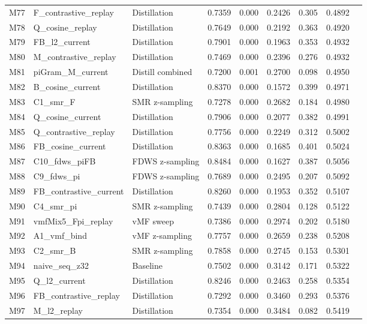 \documentclass[11pt,a4paper]{article}
\begin{document}
\begin{small}
\begin{longtable}{llp{3cm}rrrrrr}
    M77 & F\_contrastive\_replay & Distillation & 0.7359 & 0.000 & 0.2426 & 0.305 & 0.4892 \\
    M78 & Q\_cosine\_replay & Distillation & 0.7649 & 0.000 & 0.2192 & 0.363 & 0.4920 \\
    M79 & FB\_l2\_current & Distillation & 0.7901 & 0.000 & 0.1963 & 0.353 & 0.4932 \\
    M80 & M\_contrastive\_replay & Distillation & 0.7469 & 0.000 & 0.2396 & 0.276 & 0.4932 \\
    M81 & piGram\_M\_current & Distill combined & 0.7200 & 0.001 & 0.2700 & 0.098 & 0.4950 \\
    M82 & B\_cosine\_current & Distillation & 0.8370 & 0.000 & 0.1572 & 0.399 & 0.4971 \\
    M83 & C1\_smr\_F & SMR z-sampling & 0.7278 & 0.000 & 0.2682 & 0.184 & 0.4980 \\
    M84 & Q\_cosine\_current & Distillation & 0.7906 & 0.000 & 0.2077 & 0.382 & 0.4991 \\
    M85 & Q\_contrastive\_replay & Distillation & 0.7756 & 0.000 & 0.2249 & 0.312 & 0.5002 \\
    M86 & FB\_cosine\_current & Distillation & 0.8363 & 0.000 & 0.1685 & 0.401 & 0.5024 \\
    M87 & C10\_fdws\_piFB & FDWS z-sampling & 0.8484 & 0.000 & 0.1627 & 0.387 & 0.5056 \\
    M88 & C9\_fdws\_pi & FDWS z-sampling & 0.7689 & 0.000 & 0.2495 & 0.207 & 0.5092 \\
    M89 & FB\_contrastive\_current & Distillation & 0.8260 & 0.000 & 0.1953 & 0.352 & 0.5107 \\
    M90 & C4\_smr\_pi & SMR z-sampling & 0.7439 & 0.000 & 0.2804 & 0.128 & 0.5122 \\
    M91 & vmfMix5\_Fpi\_replay & vMF sweep & 0.7386 & 0.000 & 0.2974 & 0.202 & 0.5180 \\
    M92 & A1\_vmf\_bind & vMF z-sampling & 0.7757 & 0.000 & 0.2659 & 0.238 & 0.5208 \\
    M93 & C2\_smr\_B & SMR z-sampling & 0.7858 & 0.000 & 0.2745 & 0.153 & 0.5301 \\
    M94 & naive\_seq\_z32 & Baseline & 0.7502 & 0.000 & 0.3142 & 0.171 & 0.5322 \\
    M95 & Q\_l2\_current & Distillation & 0.8246 & 0.000 & 0.2463 & 0.258 & 0.5354 \\
    M96 & FB\_contrastive\_replay & Distillation & 0.7292 & 0.000 & 0.3460 & 0.293 & 0.5376 \\
    M97 & M\_l2\_replay & Distillation & 0.7354 & 0.000 & 0.3484 & 0.082 & 0.5419 \\

\end{longtable}
\end{small}
\end{document}
